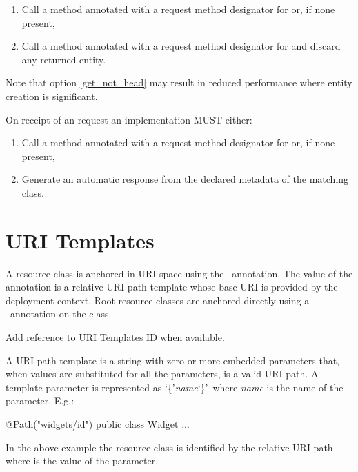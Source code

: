 \begin{enumerate}
\item Call a method annotated with a request method designator for  or, if none present,
\item\label{get_not_head} Call a method annotated with a request method designator for  and discard any returned entity.
\end{enumerate}

Note that option \ref{get_not_head} may result in reduced performance where entity creation is significant.

On receipt of an  request an implementation MUST either:

\begin{enumerate}
\item Call a method annotated with a request method designator for  or, if none present,
\item Generate an automatic response from the declared metadata of the matching class.
\end{enumerate}

\section{URI Templates}

A resource class is anchored in URI space using the \Path\ annotation. The value of the annotation is a relative URI path template whose base URI is provided by the deployment context. Root resource classes are anchored directly using a \Path\ annotation on the class.

\begin{ednote}Add reference to URI Templates ID when available.\end{ednote}

A URI path template is a string with zero or more embedded parameters that, when values are substituted for all the parameters, is a valid URI\cite{uri} path. A template parameter is represented as \lq\{\rq{\em name}\lq\}\rq\ where {\em name} is the name of the parameter. E.g.:

\begin{listing}{1}
@Path("widgets/{id}")
public class Widget {
  ...
}\end{listing}

In the above example the  resource class is identified by the relative URI path  where  is the value of the  parameter.

